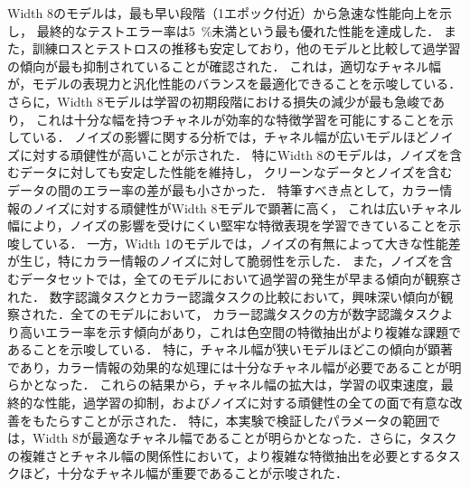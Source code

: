Width 8のモデルは，最も早い段階（1エポック付近）から急速な性能向上を示し，
最終的なテストエラー率は\SI{5}{\percent}未満という最も優れた性能を達成した．
また，訓練ロスとテストロスの推移も安定しており，他のモデルと比較して過学習の傾向が最も抑制されていることが確認された．
これは，適切なチャネル幅が，モデルの表現力と汎化性能のバランスを最適化できることを示唆している．
さらに，Width 8モデルは学習の初期段階における損失の減少が最も急峻であり，
これは十分な幅を持つチャネルが効率的な特徴学習を可能にすることを示している．
ノイズの影響に関する分析では，チャネル幅が広いモデルほどノイズに対する頑健性が高いことが示された．
特にWidth 8のモデルは，ノイズを含むデータに対しても安定した性能を維持し，
クリーンなデータとノイズを含むデータの間のエラー率の差が最も小さかった．
特筆すべき点として，カラー情報のノイズに対する頑健性がWidth 8モデルで顕著に高く，
これは広いチャネル幅により，ノイズの影響を受けにくい堅牢な特徴表現を学習できていることを示唆している．
一方，Width 1のモデルでは，ノイズの有無によって大きな性能差が生じ，特にカラー情報のノイズに対して脆弱性を示した．
また，ノイズを含むデータセットでは，全てのモデルにおいて過学習の発生が早まる傾向が観察された．
数字認識タスクとカラー認識タスクの比較において，興味深い傾向が観察された．全てのモデルにおいて，
カラー認識タスクの方が数字認識タスクより高いエラー率を示す傾向があり，これは色空間の特徴抽出がより複雑な課題であることを示唆している．
特に，チャネル幅が狭いモデルほどこの傾向が顕著であり，カラー情報の効果的な処理には十分なチャネル幅が必要であることが明らかとなった．
これらの結果から，チャネル幅の拡大は，学習の収束速度，最終的な性能，過学習の抑制，およびノイズに対する頑健性の全ての面で有意な改善をもたらすことが示された．
特に，本実験で検証したパラメータの範囲では，Width 8が最適なチャネル幅であることが明らかとなった．さらに，タスクの複雑さとチャネル幅の関係性において，より複雑な特徴抽出を必要とするタスクほど，十分なチャネル幅が重要であることが示唆された．

